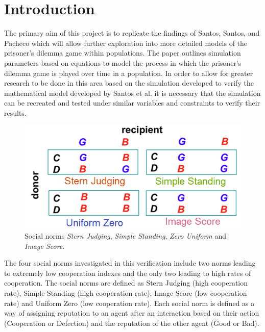 \documentclass[10pt,a4paper]{article}
\begin{document}
\section{Introduction}
The primary aim of this project is to replicate the findings of Santos, Santos, and Pacheco which will allow further exploration into more detailed models of the prisoner’s dilemma game within populations. The paper outlines simulation parameters based on equations to model the process in which the prisoner’s dilemma game is played over time in a population. 
In order to allow for greater research to be done in this area based on the simulation developed to verify the mathematical model developed by Santos et al. it is necessary that the simulation can be recreated and tested under similar variables and constraints to verify their results.
\\

\begin{figure}
  \includegraphics[width=\linewidth]{social_norms.PNG}
  \caption{Social norms \textit{Stern Judging}, \textit{Simple Standing}, \textit{Zero Uniform} and \textit{Image Score}.}
  \label{fig:Runtime1}
\end{figure}

The four social norms investigated in this verification include two norms leading to extremely low cooperation indexes and the only two leading to high rates of cooperation.
The social norms are defined as Stern Judging (high cooperation rate), Simple Standing (high cooperation rate), Image Score (low cooperation rate) and Uniform Zero (low cooperation rate).
Each social norm is defined as a way of assigning reputation to an agent after an interaction based on their action (Cooperation or Defection) and the reputation of the other agent (Good or Bad).
\end{document}

